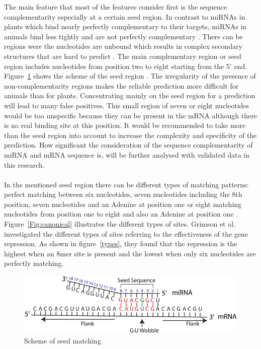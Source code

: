 \documentclass[12pt]{article}
\begin{document}
The main feature that most of the features consider first is the sequence complementarity especially at a certain seed region. In contrast to miRNAs in plants which bind nearly perfectly complementary to their targets, miRNAs in animals bind less tightly and are not perfectly complementary \cite{Rhoades}. There can be regions were the nucleotides are unbound which results in complex secondary structures that are hard to predict \cite{Rehmsmeier}. The main complementary region or seed region includes nucleotides from position two to eight starting from the 5' end. Figure~\ref{seed} shows the scheme of the seed region \cite{Peterson}. 
The irregularity of the presence of non-complementarity regions makes the reliable prediction more difficult for animals than for plants. Concentrating mainly on the seed region for a prediction will lead to many false positives. This small region of seven or eight nucleotides would be too unspecific because they can be present in the mRNA although there is no real binding site at this position. It would be recommended to take more than the seed region into account to increase the complexity and specificity of the prediction. How significant the consideration of the sequence complementarity of miRNA and mRNA sequence is, will be further analysed with validated data in this research.\\\\
In the mentioned seed region there can be different types of matching patterns: perfect matching between six nucleotides, seven nucleotides including the 8th position, seven nucleotides and an Adenine at position one or eight matching nucleotides from position one to eight and also an Adenine at position one  \cite{Lewis} \cite{Brennecke} \cite{Krek}. Figure~\ref{Fig:canonical} illustrates the different types of sites. Grimson et al. \cite{Grimson} investigated the different types of sites referring to the effectiveness of the gene repression. As shown in figure~\ref{types}, they found that the repression is the highest when an 8mer site is present and the lowest when only six nucleotides are perfectly matching. \\


\begin{figure}[h]
\centering
\includegraphics[scale=2.8]{results/seedmatching.png} 
\caption{Scheme of seed matching}
\label{seed}
\end{figure}
\end{document}
